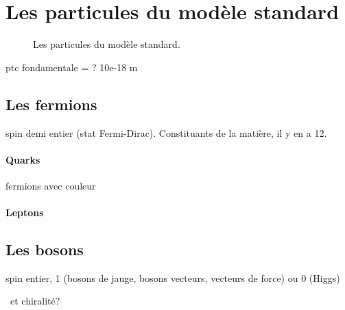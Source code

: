 \section{Les particules du modèle standard}

\begin{figure}[h]
\ifdefined\homedir \else {}\fi
{}
\caption{Les particules du modèle standard.}
\end{figure}

ptc fondamentale = ? 10e-18 m

\subsection{Les fermions}
spin demi entier (stat Fermi-Dirac). Constituants de la matière, il y en a 12.

\paragraph{Quarks} fermions avec couleur

\paragraph{Leptons}


\subsection{Les bosons}
spin entier, 1 (bosons de jauge, bosons vecteurs, vecteurs de force) ou 0 (Higgs)

\Wboson\ et chiralité?

